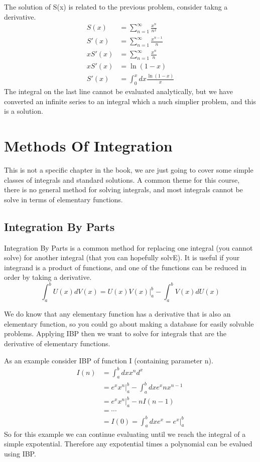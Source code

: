 \documentclass{article}
\newcommand{\be}{\begin{equation}}
\newcommand{\ee}{\end{equation}}
\begin{document}
The solution of S(x) is related to the previous problem, consider takng a derivative.
\be
\begin{split}
	S(x) &= \sum_{n=1}^\infty \frac{x^n}{n^2}\\
	S'(x) &= \sum_{n=1}^\infty \frac{x^{n-1}}{n}\\
	x S'(x) &= \sum_{n=1}^\infty \frac{x^{n}}{n}\\
	x S'(x) &= \ln(1-x)\\
	S'(x) &= \int_0^x dx \frac{\ln(1-x)}{x}
\end{split}
\ee
The integral on the last line cannot be evaluated analytically, but we have converted an infinite series to an integral which a nuch simplier problem, and this is a solution.

\section*{Methods Of Integration}
This is not a specific chapter in the book, we are just going to cover some simple classes of integrals and standard solutions.
A common theme for this course, there is no general method for solving integrals, and most integrals cannot be solve in terms of elementary functions.

\subsection*{Integration By Parts}
Integration By Parts is a common method for replacing one integral (you cannot solve) for another integral (that you can hopefully solvE).
It is useful if your integrand is a product of functions, and one of the functions can be reduced in order by taking a derivative.
\be
\int_a^b U(x) dV(x) = U(x) V(x) \bigg | _a^b - \int_a^b V(x) dU(x)
\ee

We do know that any elementary function has a derivative that is also an elementary function, so you could go about making a database for easily solvable problems.
Applying IBP then we want to solve for integrals that are the derivative of elementary functions.

As an example consider IBP of function I (containing parameter n).
\be
\begin{split}
	I(n) &= \int_a^b dx x^n d^x\\
	&= e^x x^n \bigg |_a^b - \int_a^b dx e^x n x^{n-1} \\
	&= e^x x^n \bigg |_a^b - n I(n-1)\\
	&= \cdots \\
	&= I(0) = \int_a^b dx e^x = e^x \bigg |_a^b
\end{split}
\ee
So for this example we can continue evaluating until we reach the integral of a simple expotential.
Therefore any expotential times a polynomial can be evalued using IBP.
\end{document}
